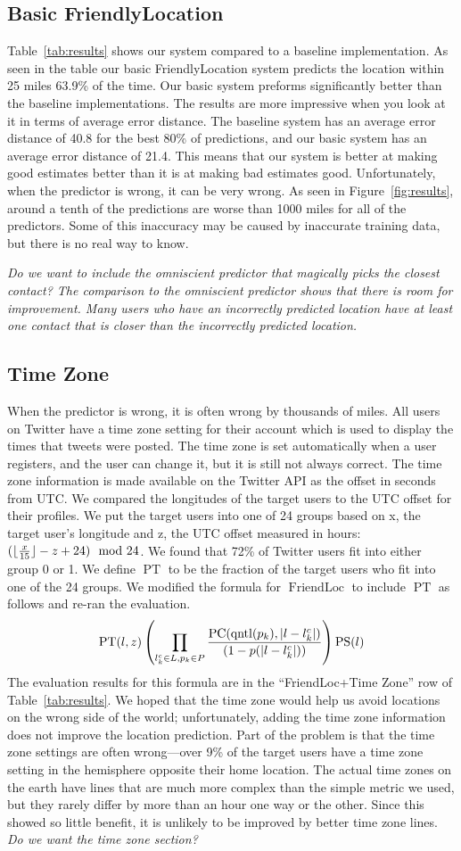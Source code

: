 \documentclass[letterpaper]{article}
\DeclareMathOperator{\pContact}{PC}
\DeclareMathOperator{\pTimeZone}{PT}
\DeclareMathOperator{\pStrangers}{PS}
\DeclareMathOperator{\FriendLoc}{FriendLoc}
\DeclareMathOperator{\quantile}{qntl}
\newcommand{\jam}[1]{\emph{#1}}
\newcommand{\flsec}[1]{\subsection{#1}}
\begin{document}
\flsec{Basic FriendlyLocation}

Table~\ref{tab:results} shows our system compared to a baseline implementation.
%
As seen in the table our basic FriendlyLocation system predicts the location
within 25 miles 63.9\% of the time.
%
Our basic system preforms significantly better than the baseline implementations.
%
The results are more impressive when you look at it in terms of average error
distance.
%
The baseline system has an average error distance of 40.8 for the best 80\% of
predictions, and our basic system has an average error distance of 21.4.
%
This means that our system is better at making good estimates better than it is
at making bad estimates good.
%
Unfortunately, when the predictor is wrong, it can be very wrong.
%
As seen in Figure~\ref{fig:results}, around a tenth of the predictions are worse
than 1000 miles for all of the predictors.
%
Some of this inaccuracy may be caused by inaccurate training data, but there is
no real way to know.

\jam{Do we want to include the omniscient predictor that magically picks the
closest contact?
%
The comparison to the omniscient predictor shows that there is room for improvement.
%
Many users who have an incorrectly predicted location have at least one contact
that is closer than the incorrectly predicted location.
}

\ifdefined\THESIS
\flsec{Time Zone}
When the predictor is wrong, it is often wrong by thousands of miles.
%
All users on Twitter have a time zone setting for their account which is used
to display the times that tweets were posted.
%
The time zone is set automatically when a user registers, and the user can
change it, but it is still not always correct.
%
The time zone information is made available on the Twitter API as the offset
in seconds from UTC.
%
We compared the longitudes of the target users to the UTC offset for their
profiles.
%
We put the target users into one of 24 groups based on x, the target user's
longitude and z, the UTC offset measured in hours:
${(\lfloor {x\over15}\rfloor-z+24)\mod{24}}$.
%
We found that 72\% of Twitter users fit into either group 0 or 1.
%
We define $\pTimeZone$ to be the fraction of the target users who fit into one
of the 24 groups.
%
We modified the formula for $\FriendLoc$ to include $\pTimeZone$ as follows and
re-ran the evaluation.
\[
    \pTimeZone(l,z)
    \left(
        \prod_{l^c_k \in L,p_k \in P}
        {\pContact(\quantile(p_k),|l-l^c_k|) \over (1-p(|l-l^c_k|))}
    \right)
    \pStrangers(l)
\]
The evaluation results for this formula are in the ``FriendLoc+Time Zone'' row
of Table~\ref{tab:results}.
%
We hoped that the time zone would help us avoid locations on the wrong side of
the world; unfortunately, adding the time zone information does not improve the
location prediction.
%
Part of the problem is that the time zone settings are often wrong---over 9\% of
the target users have a time zone setting in the hemisphere opposite their home
location.
%
The actual time zones on the earth have lines that are much more complex than
the simple metric we used, but they rarely differ by more than an hour one way
or the other.
%
Since this showed so little benefit, it is unlikely to be improved by better
time zone lines.
\jam{Do we want the time zone section?}
\fi
\end{document}
